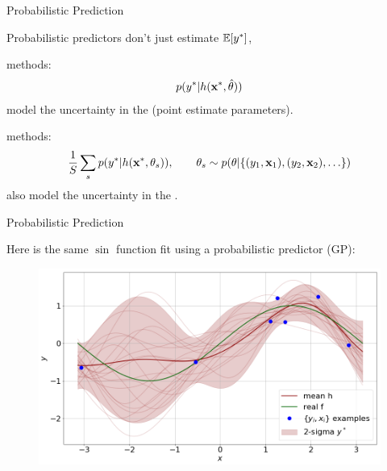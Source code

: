 \documentclass[lualatex, aspectratio=169]{beamer}
\begin{document}
\begin{frame}{Probabilistic Prediction}

  Probabilistic predictors don't just estimate $\mathbb{E}\!\left[{{y}^{*}}\right]$,

  \begin{description}[\leftmargin=0cm]
    \item[Maximum Likelihood] methods:
      \begin{align*}
        p({y}^{*} | h({\mathbf{x}}^{*}, \hat\theta))
      \end{align*}
      model the uncertainty in the  (point estimate parameters).
    \item[Bayesian] methods:
      \begin{align*}
        \frac{1}{S} \sum_s p({y}^{*} | h({\mathbf{x}}^{*}, \theta_s)),
          \qquad \theta_s \sim p(\theta | \{(y_1, \mathbf{x}_1), (y_2, \mathbf{x}_2), \ldots \})
      \end{align*}
      also model the uncertainty in the .
  \end{description}
\end{frame}


\begin{frame}{Probabilistic Prediction}

  Here is the same $\sin$ function fit using a probabilistic predictor (GP):
  \begin{figure}
    \includegraphics[width=0.7\pagewidth]{assets/probabilistic.png}
  \end{figure}

\end{frame}
\end{document}
